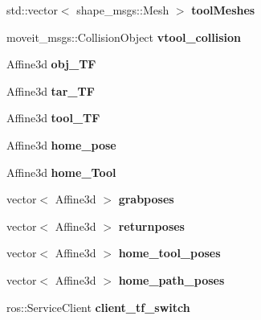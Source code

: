 \begin{DoxyCompactItemize}
std\+::vector$<$ shape\+\_\+msgs\+::\+Mesh $>$ {\bfseries tool\+Meshes}
\item 
\mbox{\label{structManipulate_a57ed7506e31afe601551a284ca29fe34}} 
moveit\+\_\+msgs\+::\+Collision\+Object {\bfseries vtool\+\_\+collision}
\item 
\mbox{\label{structManipulate_ac37045cee2d3fd9b6025b46a365aab43}} 
Affine3d {\bfseries obj\+\_\+\+TF}
\item 
\mbox{\label{structManipulate_ab4866834cec7f71b74b53f8097ee1d53}} 
Affine3d {\bfseries tar\+\_\+\+TF}
\item 
\mbox{\label{structManipulate_a473d84c732bc17822fc57f720a3c8ae0}} 
Affine3d {\bfseries tool\+\_\+\+TF}
\item 
\mbox{\label{structManipulate_a6b509a52e3197673ff245f6a1891fc2a}} 
Affine3d {\bfseries home\+\_\+pose}
\item 
\mbox{\label{structManipulate_abd30b4a875d9f16ad9c4d4bcfd598e5f}} 
Affine3d {\bfseries home\+\_\+\+Tool}
\item 
\mbox{\label{structManipulate_a3263f7c419ed41fa6932e5333182ce6c}} 
vector$<$ Affine3d $>$ {\bfseries grabposes}
\item 
\mbox{\label{structManipulate_ad2613456f6c5df53733df708079e85f9}} 
vector$<$ Affine3d $>$ {\bfseries returnposes}
\item 
\mbox{\label{structManipulate_a1b2d2d862effd2d7010f2fe330ad2d5d}} 
vector$<$ Affine3d $>$ {\bfseries home\+\_\+tool\+\_\+poses}
\item 
\mbox{\label{structManipulate_a4b9ef023271b0bcf0f08579d54fb9e25}} 
vector$<$ Affine3d $>$ {\bfseries home\+\_\+path\+\_\+poses}
\item 
\mbox{\label{structManipulate_ad142e3343478bbaa21e80e3045198a4c}} 
ros\+::\+Service\+Client {\bfseries client\+\_\+tf\+\_\+switch}
\item 

\end{DoxyCompactItemize}
